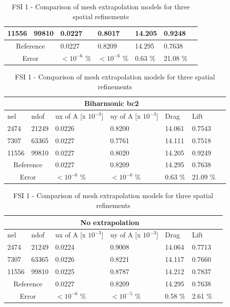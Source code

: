 \begin{table}[h!]
\begin{tabular}{ |p{1cm}||p{1cm}|p{2.8cm}|p{2.8cm}|p{2.7cm}|p{2.7cm}|p{1.2cm}|}
 11556   & 99810  &       0.0227  &       0.8017 & 14.205 & 0.9248 \\
  \hline
 \multicolumn{2}{|c|}{Reference} &  0.0227      &       0.8209      & 14.295  & 0.7638   \\
 \hline
    \multicolumn{2}{|c|}{Error}  & $ < 10^{-6}$  \% &  $ <10^{-6}$  \%  & 0.63 \% & 21.08 \% \\
 \hline
\end{tabular}
\begin{tabular}{ |p{1cm}||p{1cm}|p{2.8cm}|p{2.8cm}|p{2.7cm}|p{2.7cm}|p{1.2cm}|}
 \hline
  \multicolumn{6}{|c|}{Biharmonic bc2} \\
   \hline
nel & ndof & ux of A [x $10^{-3}$]  &uy of A [x $10^{-3}$]& Drag  & Lift \\
 \hline
 2474    & 21249  &       0.0226 &       0.8200 & 14.061 & 0.7543 \\
 7307    & 63365  &       0.0227 &       0.7761 & 14.111 & 0.7518 \\
 11556   & 99810  &       0.0227 &       0.8020 & 14.205 & 0.9249  \\
  \hline
 \multicolumn{2}{|c|}{Reference} &  0.0227      &       0.8209      & 14.295  & 0.7638   \\
 \hline
    \multicolumn{2}{|c|}{Error}  & $ < 10^{-6}$  \% &  $ <10^{-6}$  \%  & 0.63 \% & 21.09 \% \\
 \hline
\end{tabular}

\begin{tabular}{ |p{1cm}||p{1cm}|p{2.8cm}|p{2.8cm}|p{2.7cm}|p{2.7cm}|p{1.2cm}|}
 \hline
  \multicolumn{6}{|c|}{No extrapolation} \\
   \hline
nel & ndof & ux of A [x $10^{-3}$]  &uy of A [x $10^{-3}$]& Drag  & Lift \\
 \hline
 2474    & 21249  &       0.0224 &       0.9008 & 14.064 & 0.7713 \\
 7307    & 63365  &       0.0226  &       0.8221 & 14.117 & 0.7660 \\
 11556   & 99810  &       0.0225 &       0.8787 & 14.212 & 0.7837 \\
   \hline
 \multicolumn{2}{|c|}{Reference} &  0.0227      &       0.8209      & 14.295  & 0.7638   \\
 \hline
    \multicolumn{2}{|c|}{Error}  &   $ < 10^{-6}$  \% &  $ <10^{-5}$  \% & 0.58 \% & 2.61 \%  \\
 \hline
\end{tabular}
\caption{FSI 1 - Comparison of mesh extrapolation models for three spatial refinements}
\end{table}

